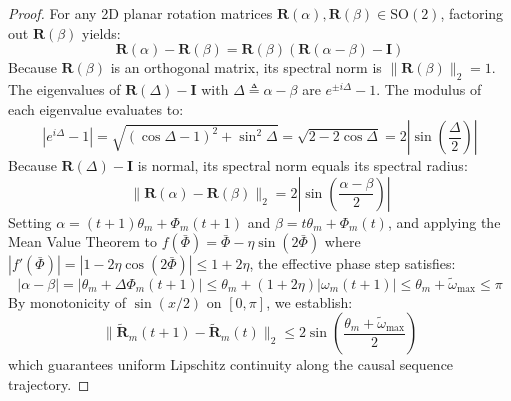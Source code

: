 \documentclass[11pt,a4paper]{article}
\theoremstyle{definition}
\begin{document}
\begin{proof}
For any 2D planar rotation matrices $\mathbf{R}(\alpha), \mathbf{R}(\beta) \in \mathrm{SO}(2)$, factoring out $\mathbf{R}(\beta)$ yields:
\begin{equation}
\mathbf{R}(\alpha) - \mathbf{R}(\beta) = \mathbf{R}(\beta) \left( \mathbf{R}(\alpha - \beta) - \mathbf{I} \right)
\end{equation}
Because $\mathbf{R}(\beta)$ is an orthogonal matrix, its spectral norm is $\|\mathbf{R}(\beta)\|_2 = 1$. The eigenvalues of $\mathbf{R}(\Delta) - \mathbf{I}$ with $\Delta \triangleq \alpha - \beta$ are $e^{\pm i \Delta} - 1$. The modulus of each eigenvalue evaluates to:
\begin{equation}
|e^{i \Delta} - 1| = \sqrt{(\cos\Delta - 1)^2 + \sin^2\Delta} = \sqrt{2 - 2\cos\Delta} = 2\left|\sin\left(\frac{\Delta}{2}\right)\right|
\end{equation}
Because $\mathbf{R}(\Delta) - \mathbf{I}$ is normal, its spectral norm equals its spectral radius:
\begin{equation}
\|\mathbf{R}(\alpha) - \mathbf{R}(\beta)\|_2 = 2\left|\sin\left(\frac{\alpha - \beta}{2}\right)\right|
\end{equation}
Setting $\alpha = (t+1)\theta_m + \Phi_m(t+1)$ and $\beta = t\theta_m + \Phi_m(t)$, and applying the Mean Value Theorem to $f(\bar{\Phi}) = \bar{\Phi} - \eta\sin(2\bar{\Phi})$ where $|f'(\bar{\Phi})| = |1 - 2\eta\cos(2\bar{\Phi})| \le 1 + 2\eta$, the effective phase step satisfies:
\begin{equation}
|\alpha - \beta| = |\theta_m + \Delta\Phi_m(t+1)| \le \theta_m + (1 + 2\eta)|\omega_m(t+1)| \le \theta_m + \tilde{\omega}_{\max} \le \pi
\end{equation}
By monotonicity of $\sin(x/2)$ on $[0, \pi]$, we establish:
\begin{equation}
\|\tilde{\mathbf{R}}_m(t+1) - \tilde{\mathbf{R}}_m(t)\|_2 \le 2\sin\left(\frac{\theta_m + \tilde{\omega}_{\max}}{2}\right)
\end{equation}
which guarantees uniform Lipschitz continuity along the causal sequence trajectory.
\end{proof}
\end{document}
